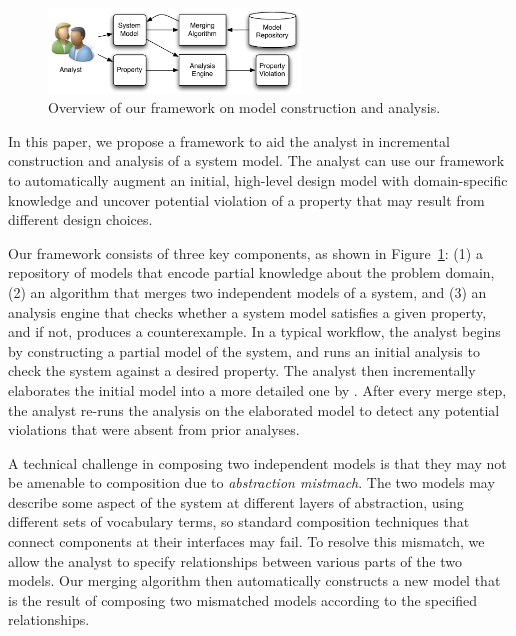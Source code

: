 \begin{figure}[!t]
\centering
\includegraphics[width=0.60\textwidth]{diagrams/overview}
\caption{Overview of our framework on model construction and analysis.}
\label{fig-overview}
\end{figure}

In this paper, we propose a framework to aid the analyst in
incremental construction and analysis of a system model. The analyst
can use our framework to automatically augment an initial, high-level
design model with domain-specific knowledge and uncover potential
violation of a property that may result from different design choices.

Our framework consists of three key
components, as shown in Figure~\ref{fig-overview}: (1) a repository of
models that encode partial knowledge about the problem domain, (2) an
algorithm that merges two independent models of a system, and (3) an
analysis engine that checks whether a system model satisfies a given
property, and if not, produces a counterexample. In a typical
workflow, the analyst begins by constructing a partial model of the
system, and runs an initial analysis to check the system against a
desired property. The analyst then incrementally elaborates the
initial model into a more detailed one by . After every
merge step, the analyst re-runs the analysis on the elaborated model
to detect any potential violations that were absent from prior
analyses.

A technical challenge in composing two independent models is that they
may not be amenable to composition due to \textit{abstraction
  mistmach}. The two models may describe some aspect of the system
at different layers of abstraction, using different sets of vocabulary
terms, so standard composition techniques that connect components at
their interfaces may fail. To resolve this mismatch, we allow the
analyst to specify relationships between various parts of the two
models. Our merging algorithm then automatically constructs a new
model that is the result of composing two mismatched models according
to the specified relationships.

